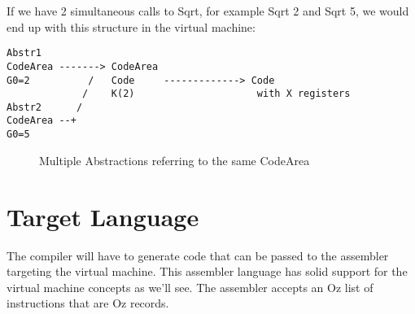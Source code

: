 \documentclass[a4paper]{memoir}
\begin{document}
If we have 2 simultaneous calls to Sqrt, for example {Sqrt 2} and {Sqrt 5}, we
would end up with this structure in the virtual machine:

\begin{verbatim}
Abstr1
CodeArea -------> CodeArea
G0=2          /   Code     -------------> Code
             /    K(2)                     with X registers
Abstr2      /
CodeArea --+
G0=5
\end{verbatim}

\begin{figure}[h]
  \centering
{}
\caption{Multiple Abstractions referring to the same CodeArea}
\end{figure}


\section{Target Language}
The compiler will have to generate code that can be passed to the assembler targeting the virtual machine. This assembler language has solid support for the virtual machine concepts as we'll see.
The assembler accepts an Oz list of instructions that are Oz records. 
\end{document}
